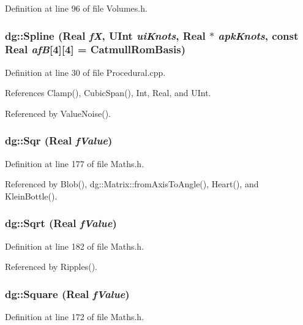 Definition at line 96 of file Volumes.h.
\subsubsection{ dg::Spline ({\bf Real} {\em f\-X}, {\bf UInt} {\em ui\-Knots}, {\bf Real} $\ast$ {\em apk\-Knots}, const {\bf Real} {\em af\-B}[4][4] = Catmull\-Rom\-Basis)}\label{namespacedg_a126}




Definition at line 30 of file Procedural.cpp.

References Clamp(), Cubic\-Span(), Int, Real, and UInt.

Referenced by Value\-Noise().
\subsubsection{ dg::Sqr ({\bf Real} {\em f\-Value})\hspace{0.3cm}{\tt  [inline]}}\label{namespacedg_a100}




Definition at line 177 of file Maths.h.

Referenced by Blob(), dg::Matrix::from\-Axis\-To\-Angle(), Heart(), and Klein\-Bottle().
\subsubsection{ dg::Sqrt ({\bf Real} {\em f\-Value})\hspace{0.3cm}{\tt  [inline]}}\label{namespacedg_a101}




Definition at line 182 of file Maths.h.

Referenced by Ripples().
\subsubsection{ dg::Square ({\bf Real} {\em f\-Value})\hspace{0.3cm}{\tt  [inline]}}\label{namespacedg_a99}




Definition at line 172 of file Maths.h.
